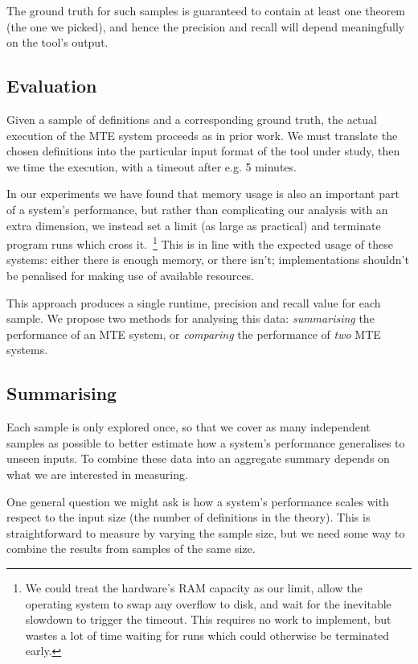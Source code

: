 The ground truth for such samples is guaranteed to contain at least one theorem
(the one we picked), and hence the precision and recall will depend meaningfully
on the tool's output.

\subsection{Evaluation}

Given a sample of definitions and a corresponding ground truth, the actual
execution of the MTE system proceeds as in prior work. We must translate the
chosen definitions into the particular input format of the tool under study,
then we time the execution, with a timeout after e.g. 5 minutes.

In our experiments we have found that memory usage is also an important part of
a system's performance, but rather than complicating our analysis with an extra
dimension, we instead set a limit (as large as practical) and terminate program
runs which cross it.~\footnote{We could treat the hardware's RAM capacity as our
  limit, allow the operating system to swap any overflow to disk, and wait for
  the inevitable slowdown to trigger the timeout. This requires no work to
  implement, but wastes a lot of time waiting for runs which could otherwise be
  terminated early.} This is in line with the expected usage of these systems:
either there is enough memory, or there isn't; implementations shouldn't be
penalised for making use of available resources.

This approach produces a single runtime, precision and recall value for each
sample. We propose two methods for analysing this data: \emph{summarising}
the performance of an MTE system, or \emph{comparing} the performance of
\emph{two} MTE systems.

\subsection{Summarising}

Each sample is only explored once, so that we cover as many independent samples
as possible to better estimate how a system's performance generalises to unseen
inputs. To combine these data into an aggregate summary depends on what we are
interested in measuring.

One general question we might ask is how a system's performance scales with
respect to the input size (the number of definitions in the theory). This is
straightforward to measure by varying the sample size, but we need some way to
combine the results from samples of the same size.

